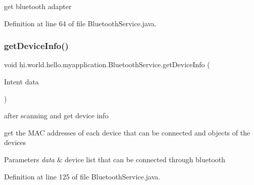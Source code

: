 get bluetooth adapter 



Definition at line 64 of file Bluetooth\+Service.\+java.


\begin{DoxyCode}{0}

\end{DoxyCode}
\mbox{\label{classhi_1_1world_1_1hello_1_1myapplication_1_1_bluetooth_service_a8d6db94de0f1a864a775d1e93f796bab}} 
\subsubsection{\texorpdfstring{getDeviceInfo()}{getDeviceInfo()}}
{\footnotesize\ttfamily void hi.\+world.\+hello.\+myapplication.\+Bluetooth\+Service.\+get\+Device\+Info (\begin{DoxyParamCaption}\item[{Intent}]{data }\end{DoxyParamCaption})}



after scanning and get device info 

get the M\+AC addresses of each device that can be connected and objects of the devices 
\begin{DoxyParams}{Parameters}
{\em data} & device list that can be connected through bluetooth \\
\hline
\end{DoxyParams}


Definition at line 125 of file Bluetooth\+Service.\+java.


